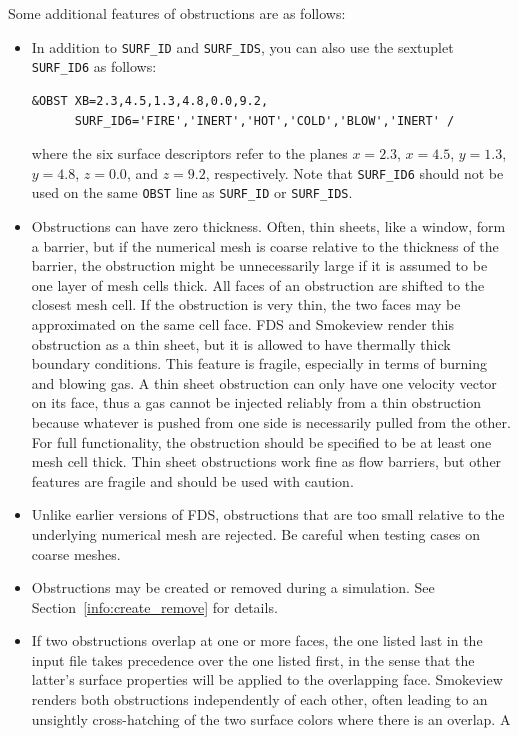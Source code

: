 \documentclass[11pt]{book}
\newcommand{\ct}{\tt\small}
\begin{document}
\noindent
Some additional features of obstructions are as follows:
\begin{itemize}
\item In addition to {\ct SURF\_ID} and {\ct SURF\_IDS}, you can also use
the sextuplet {\ct SURF\_ID6} as follows:

\footnotesize
\begin{verbatim}
&OBST XB=2.3,4.5,1.3,4.8,0.0,9.2,
      SURF_ID6='FIRE','INERT','HOT','COLD','BLOW','INERT' /
\end{verbatim}
\normalsize
where the six surface descriptors refer to the planes $x=2.3$, $x=4.5$, $y=1.3$, $y=4.8$,
$z=0.0$, and $z=9.2$, respectively.
Note that {\ct SURF\_ID6} should not be used on the same {\ct OBST}
line as {\ct SURF\_ID} or {\ct SURF\_IDS}.
\item Obstructions can have zero thickness. Often, thin sheets, like a window, form a barrier,
but if the numerical mesh is coarse relative to the thickness of the barrier, the obstruction
might be unnecessarily large if it is assumed to be one layer of mesh cells thick. All faces
of an obstruction are shifted to the closest mesh cell. If the obstruction is very thin, the two
faces may be approximated on the same cell face. FDS and Smokeview render
this obstruction as a thin sheet, but it is allowed to have thermally
thick boundary conditions. This feature is fragile, especially in terms
of burning and blowing gas. A thin sheet obstruction can only have one velocity
vector on its face, thus a gas cannot be injected reliably from a
thin obstruction because whatever is pushed from one side is necessarily pulled from the other.
For full functionality, the obstruction should be specified to
be at least one mesh cell thick. Thin sheet obstructions
work fine as flow barriers, but other features are fragile and should be used with
caution.
\item Unlike earlier versions of FDS, obstructions that are
too small relative to the underlying numerical mesh are rejected.
Be careful when testing cases on coarse meshes.
\item Obstructions may be created or removed during a simulation. See
Section~\ref{info:create_remove} for details.
\item If two obstructions overlap at one or more faces, the one listed last in the input file takes precedence over the one
listed first, in the sense that the latter's surface properties will be applied to the overlapping face. Smokeview renders both obstructions
independently of each other, often leading to an unsightly cross-hatching of the two surface colors where there is an overlap. A

\end{itemize}
\end{document}
